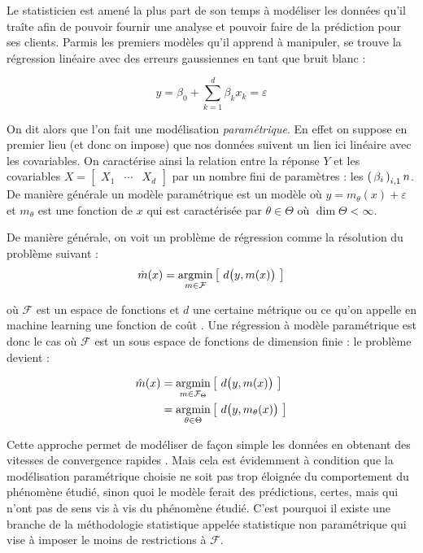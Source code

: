 Le statisticien est amené la plus part de son temps à modéliser les données qu'il traîte afin de pouvoir fournir une analyse et pouvoir faire de la prédiction pour ses clients. Parmis les premiers modèles qu'il apprend à manipuler, se trouve la régression linéaire avec des erreurs gaussiennes en tant que bruit blanc :

\begin{equation*}
    y = \beta_0 + \sum_{k=1}^d \beta_k x_k = \varepsilon
\end{equation*}

On dit alors que l'on fait une modélisation \emph{paramétrique}. En effet on suppose en premier lieu (et donc on impose) que nos données suivent un lien ici linéaire avec les covariables. On caractérise ainsi la relation entre la réponse $Y$ et les covariables $X = \begin{bmatrix} X_1 & \cdots & X_d \end{bmatrix}$ par un nombre fini de paramètres : les $\left( \, {\beta} _ {i} \, \right)_{i, 1} n$. De manière générale un modèle paramétrique est un modèle où $y = m_\theta(x) + \varepsilon$ et $m_\theta$ est une fonction de $x$ qui est caractérisée par $\theta \in \Theta$ où $\dim \Theta < \infty$.

De manière générale, on voit un problème de régression comme la résolution du problème suivant :
\begin{equation}
    \hat m(x) = \argmin\limits_{m \in \mathcal F}\left[ \ d\bigl(y, m(x)\bigr) \ \right]
\end{equation}

où $\mathcal F$ est un espace de fonctions et $d$ une certaine métrique ou ce qu'on appelle en machine learning \og une fonction de coût \fg. Une régression à modèle paramétrique est donc le cas où $\mathcal F$ est un sous espace de fonctions de dimension finie : le problème devient :

\begin{align}
    \hat m(x) & = \argmin\limits_{m \in \mathcal F_\Theta}\left[ \ d\bigl(y, m(x)\bigr) \ \right]
    \\
    & =  \argmin\limits_{\theta \in \Theta}\left[ \ d\bigl(y, m_\theta(x)\bigr) \ \right]
\end{align}

Cette approche permet de modéliser de façon simple les données en obtenant des vitesses de convergence rapides \citationrequise. Mais cela est évidemment à condition que la modélisation paramétrique choisie ne soit pas trop éloignée du comportement du phénomène étudié, sinon quoi le modèle ferait des prédictions, certes, mais qui n'ont pas de sens vis à vis du phénomène étudié. C'est pourquoi il existe une branche de la méthodologie statistique appelée \og statistique non paramétrique \fg qui vise à imposer le moins de restrictions à $\mathcal F$.